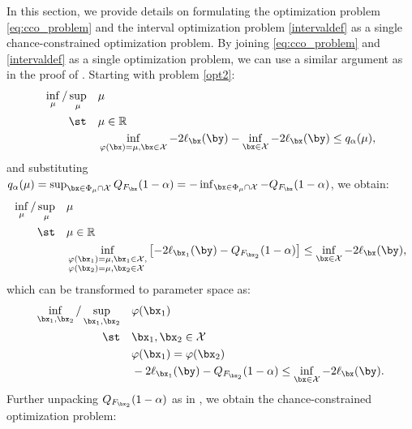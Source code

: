 \documentclass[11pt]{article}
\numberwithin{equation}{section}
\numberwithin{figure}{section}
\begin{document}
In this section, we provide details on formulating the optimization problem \eqref{eq:cco_problem} and the interval optimization problem \eqref{intervaldef} as a single chance-constrained optimization problem.
By joining \eqref{eq:cco_problem} and \eqref{intervaldef} as a single optimization problem, we can use a similar argument as in the proof of .
Starting with problem \eqref{opt2}:
\begin{equation}\label{opt2_again}
\begin{aligned}
\inf_\mu/\sup_{\mu} \quad & \mu \\
\st \quad & \mu \in \mathbb{R} \\ & \inf_{\varphi(\bx) = \mu, \bx \in \mathcal X} -2\ell_{\bx}(\by) - \inf_{\bx \in \mathcal X} -2\ell_{\bx}(\by) \leq q_\alpha(\mu),
\end{aligned}
\end{equation}
and substituting $q_\alpha(\mu) = \sup_{\bx \in \Phi_\mu \cap \mathcal{X}}Q_{F_\bx}(1-\alpha) = -\inf_{\bx \in \Phi_\mu \cap \mathcal{X}} -Q_{F_\bx}(1-\alpha)$, we obtain:
\begin{equation}\label{opt2bisagain}
\begin{aligned}
\inf_\mu/\sup_{\mu} \quad & \mu \\
\st \quad & \mu \in \mathbb{R} \\ & \inf_{\begin{subarray}{l}
\varphi(\bx_1) = \mu, \bx_1 \in \mathcal X, \\
\varphi(\bx_2) = \mu, \bx_2 \in \mathcal X
\end{subarray}} \left [-2\ell_{\bx_1}(\by) -Q_{F_{\bx_2}}(1-\alpha) \right ]
\leq \inf_{\bx \in \mathcal X} -2\ell_{\bx}(\by),
\end{aligned}
\end{equation}
which can be transformed to parameter space as:
\begin{equation}\label{paramspaceagain}
\begin{aligned}
\inf_{\bx_1, \bx_2}/\sup_{\bx_1, \bx_2} \quad & \varphi(\bx_1) \\
\st \quad & \bx_1, \bx_2 \in \mathcal X\\
& \varphi(\bx_1) = \varphi(\bx_2) \\ 
& -2\ell_{\bx_1}(\by) - Q_{F_{\bx_2}}(1-\alpha) \leq \inf_{\bx \in \mathcal X} -2\ell_{\bx}(\by).
\end{aligned}
\end{equation}
Further unpacking $Q_{F_{\bx_2}}(1-\alpha)$ as in , we obtain the chance-constrained optimization problem:
\end{document}
